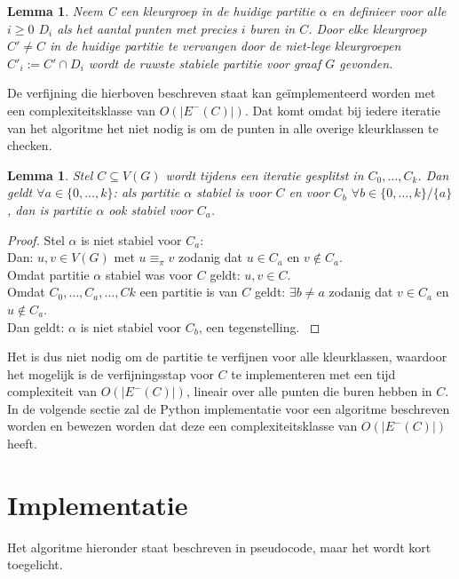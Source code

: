 \documentclass[twoside]{article}
\newtheorem{lemma}[theorem]{Lemma}
\begin{document}
\begin{multicols}{2}
\begin{lemma}
Neem C een kleurgroep in de huidige partitie $\alpha$ en definieer voor alle $i \geq 0$ $D_{i}$ als het aantal punten met precies $i$ buren in $C$. Door elke kleurgroep $C' \neq C$ in de huidige partitie te vervangen door de niet-lege kleurgroepen $C'_{i} := C'\cap D_{i}$ wordt de ruwste stabiele partitie voor graaf $G$ gevonden.
\cite{slides_DFA}
\end{lemma}

De verfijning die hierboven beschreven staat kan ge\"implementeerd worden met een complexiteitsklasse van $O(|E^{-}(C)|)$. Dat komt omdat bij iedere iteratie van het algoritme het niet nodig is om de punten in alle overige kleurklassen te checken.

\begin{lemma}
Stel $C \subseteq V(G)$ wordt tijdens een iteratie gesplitst in $C_{0}, \ldots, C_{k}$. Dan geldt $\forall a \in \{0,\ldots,k\}$: als partitie $\alpha$ stabiel is voor $C$ en voor $C_{b}$ $\forall b \in \{0,\ldots,k\}/\{a\}$, dan is partitie $\alpha$ ook stabiel voor $C_{a}$.
\end{lemma}

\begin{proof}
Stel $\alpha$ is niet stabiel voor $C_{a}$:\\
Dan: $ u,v \in V(G)$ met $u \equiv_{\pi} v$ zodanig dat $u \in C_{a}$ en $v \not \in C_{a}$.\\
Omdat partitie $\alpha$ stabiel was voor $C$ geldt: $u,v \in C$.\\
Omdat $C_{0},\ldots,C_{a},\ldots,C{k}$ een partitie is van $C$ geldt: $\exists b \neq a $ zodanig dat $v \in C_{a}$ en $u \not \in C_{a}$.\\
Dan geldt: $\alpha$ is niet stabiel voor $C_{b}$, een tegenstelling.
\cite{slides_DFA}
\end{proof}

Het is dus niet nodig om de partitie te verfijnen voor alle kleurklassen, waardoor het mogelijk is de verfijningsstap voor $C$ te implementeren met een tijd complexiteit van $O(|E^{-}(C)|)$, lineair over alle punten die buren hebben in $C$. In de volgende sectie zal de Python implementatie voor een algoritme beschreven worden en bewezen worden dat deze een complexiteitsklasse van $O(|E^{-}(C)|)$ heeft.

\section{Implementatie}
Het algoritme hieronder staat beschreven in pseudocode, maar het wordt kort toegelicht.


\end{multicols}
\end{document}
